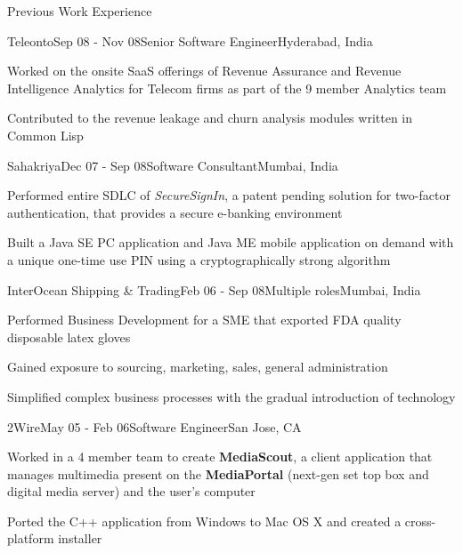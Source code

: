 \documentclass{resume} %
\begin{document}
\begin{rSection}{Previous Work Experience}

\begin{rSubsection}{Teleonto}{Sep 08 - Nov 08}{Senior Software Engineer}{Hyderabad, India}
\item Worked on the onsite SaaS offerings of Revenue Assurance and Revenue Intelligence Analytics for Telecom firms as part of the 9 member Analytics team
\item Contributed to the revenue leakage and churn analysis modules written in Common Lisp
\end{rSubsection}


\begin{rSubsection}{Sahakriya}{Dec 07 - Sep 08}{Software Consultant}{Mumbai, India}
\item Performed entire SDLC of {\em SecureSignIn}, a patent pending solution for two-factor authentication, that provides a secure e-banking environment
\item Built a Java SE PC application and Java ME mobile application on demand with a unique one-time use PIN using a cryptographically strong algorithm
\end{rSubsection}


\begin{rSubsection}{InterOcean Shipping \& Trading}{Feb 06 - Sep 08}{Multiple roles}{Mumbai, India}
\item Performed Business Development for a SME that exported FDA quality disposable latex gloves
\item Gained exposure to sourcing, marketing, sales, general administration
\item Simplified complex business processes with the gradual introduction of technology
\end{rSubsection}



\begin{rSubsection}{2Wire}{May 05 - Feb 06}{Software Engineer}{San Jose, CA}
\item Worked in a 4 member team to create {\bf MediaScout}, a client application that manages multimedia present on the {\bf MediaPortal} (next-gen set top box and digital media server) and the user's computer
\item Ported the C++ application from Windows to Mac OS X and created a cross-platform installer
\end{rSubsection}

\end{rSection}
\end{document}

